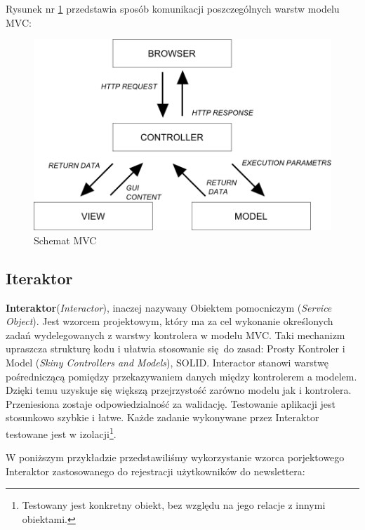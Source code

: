     Rysunek nr \ref{fig:model_mvc} przedstawia sposób komunikacji poszczególnych warstw modelu MVC:
    \begin{figure}[h]
      \centering
      \includegraphics[scale=0.87]{images/mvc_model.png}
      \caption{Schemat MVC}
      \label{fig:model_mvc}
    \end{figure}
  \clearpage
  \subsection{Iteraktor}
  \textbf{Interaktor}\cite{interactors}(\emph{Interactor}), inaczej nazywany Obiektem pomocniczym (\emph{Service Object}).
  Jest wzorcem projektowym, który ma za cel wykonanie określonych zadań wydelegowanych z warstwy kontrolera w modelu MVC. Taki mechanizm upraszcza strukturę kodu i ułatwia stosowanie się do zasad: Prosty Kontroler i Model (\emph{Skiny Controllers and Models}), SOLID.
  Interactor stanowi warstwę pośredniczącą pomiędzy przekazywaniem danych między kontrolerem a modelem.
  Dzięki temu uzyskuje się większą przejrzystość zarówno modelu jak i kontrolera. Przeniesiona zostaje odpowiedzialność za walidację. Testowanie aplikacji jest stosunkowo szybkie i łatwe. Każde zadanie wykonywane przez Interaktor testowane jest w izolacji\footnote{Testowany jest konkretny obiekt, bez względu na jego relacje z innymi obiektami.}.

  W poniższym przykładzie przedstawiliśmy wykorzystanie wzorca porjektowego Interaktor zastosowanego do rejestracji użytkowników do newslettera:\\
  
